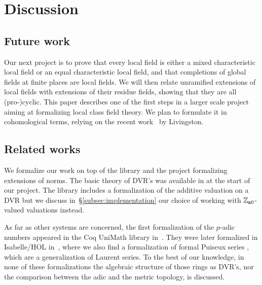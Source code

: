 \documentclass[sigplan,10pt, nonacm, review]{acmart}
\begin{document}
\section{Discussion}\label{sec:conclusion}

\subsection{Future work}\label{subsec:future_work}

Our next project is to prove that every local field is either a mixed characteristic local field or an equal characteristic local field, and that completions of global fields at finite places are local fields. We will then relate unramified extensions of local fields with extensions of their residue fields, showing that they are all (pro-)cyclic. This paper describes one of the first steps in a larger scale project aiming at formalizing local class field theory. We plan to formulate it in cohomological terms, relying on the recent work~\cite{Liv23} by Livingston.

\subsection{Related works}\label{subsec:related_work}
We formalize our work on top of the \lean library \mathlib and the \lean project \cite{deF23} formalizing extensions of norms. The basic theory of DVR's was available in \mathlib at the start of our project. The library includes a formalization of the additive valuation on a DVR but we discuss in~\S\ref{subsec:implementation} our choice of working with $\mathbb{Z}_{\mathtt{m}0}$-valued valuations instead.

As far as other systems are concerned, the first formalization of the $p$-adic numbers appeared in the Coq UniMath library in~\cite{padicsCoq}. They were later formalized in Isabelle/HOL in~\cite{padicIsa}, where we also find a formalization of formal Puiseux series \cite{PuiseuxSeriesIsa}, which are a generalization of Laurent series. To the best of our knowledge, in none of these formalizations the algebraic structure of those rings as DVR's, nor the comparison between the adic and the metric topology, is discussed. %
\end{document}
